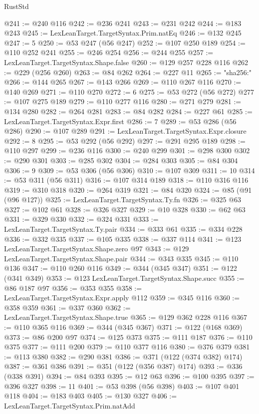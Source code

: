 \begin{lexlean}{RustStd}
\begin{coremodule}
{\begin{coremodule}
{{{{{{{{{{{{{{{{{{{{{{{{{{{{{{{{{{{{{{{{{{{{{{{@241 := @240 @116
@242 := @236 @241
@243 := @231 @242
@244 := @183 @243
@245 := LexLeanTarget.TargetSyntax.Prim.natEq
@246 := @132 @245
@247 := 5
@250 := @53 @247 (@56 @247)
@252 := @107 @250 @189
@254 := @110 @252 @241
@255 := @246 @254
@256 := @244 @255
@257 := LexLeanTarget.TargetSyntax.Shape.false
@260 := @129 @257 @228 @116
@262 := @229 (@256 @260)
@263 := @84 @262
@264 := @227 @11
@265 := "sha256:"
@266 := @144 @265
@267 := @143 @266
@269 := @110 @267 @116
@270 := @140 @269
@271 := @110 @270
@272 := 6
@275 := @53 @272 (@56 @272)
@277 := @107 @275 @189
@279 := @110 @277 @116
@280 := @271 @279
@281 := @134 @280
@282 := @264 @281
@283 := @84 @282
@284 := @227 @61
@285 := LexLeanTarget.TargetSyntax.Expr.first
@286 := 7
@289 := @53 @286 (@56 @286)
@290 := @107 @289
@291 := LexLeanTarget.TargetSyntax.Expr.closure
@292 := 8
@295 := @53 @292 (@56 @292)
@297 := @291 @295 @189
@298 := @110 @297
@299 := @236 @116
@300 := @240 @299
@301 := @298 @300
@302 := @290 @301
@303 := @285 @302
@304 := @284 @303
@305 := @84 @304
@306 := 9
@309 := @53 @306 (@56 @306)
@310 := @107 @309
@311 := 10
@314 := @53 @311 (@56 @311)
@316 := @107 @314 @189
@318 := @110 @316 @116
@319 := @310 @318
@320 := @264 @319
@321 := @84 @320
@324 := @85 (@91 (@96 @127))
@325 := LexLeanTarget.TargetSyntax.Ty.fn
@326 := @325 @63
@327 := @102 @61
@328 := @326 @327
@329 := @10 @328
@330 := @62 @63
@331 := @329 @330
@332 := @324 @331
@333 := LexLeanTarget.TargetSyntax.Ty.pair
@334 := @333 @61
@335 := @334 @228
@336 := @332 @335
@337 := @105 @335
@338 := @337 @114
@341 := @123 LexLeanTarget.TargetSyntax.Shape.zero @97
@343 := @129 LexLeanTarget.TargetSyntax.Shape.pair
@344 := @343 @335
@345 := @110 @136
@347 := @110 @260 @116
@349 := @344 (@345 @347)
@351 := @122 (@341 @349)
@353 := @123 LexLeanTarget.TargetSyntax.Shape.succ
@355 := @86 @187 @97
@356 := @353 @355
@358 := LexLeanTarget.TargetSyntax.Expr.apply @112
@359 := @345 @116
@360 := @358 @359
@361 := @337 @360
@362 := LexLeanTarget.TargetSyntax.Shape.true
@365 := @129 @362 @228 @116
@367 := @110 @365 @116
@369 := @344 (@345 @367)
@371 := @122 (@168 @369)
@373 := @86 @200 @97
@374 := @125 @373
@375 := @111 @187
@376 := @110 @375
@377 := @111 @200
@379 := @110 @377 @116
@380 := @376 @379
@381 := @113 @380
@382 := @290 @381
@386 := @371 (@122 (@374 @382) @174)
@387 := @361 @386
@391 := @351 (@122 (@356 @387) @174)
@393 := @336 (@338 @391)
@394 := @84 @393
@395 := @12 @63
@396 := @100 @395
@397 := @396 @327
@398 := 11
@401 := @53 @398 (@56 @398)
@403 := @107 @401 @118
@404 := @183 @403
@405 := @130 @327
@406 := LexLeanTarget.TargetSyntax.Prim.natAdd
}}}}}}}}}}}}}}}}}}}}}}}}}}}}}}}}}}}}}}}}}}}}}}}
\end{coremodule}}
\end{coremodule}
\end{lexlean}

